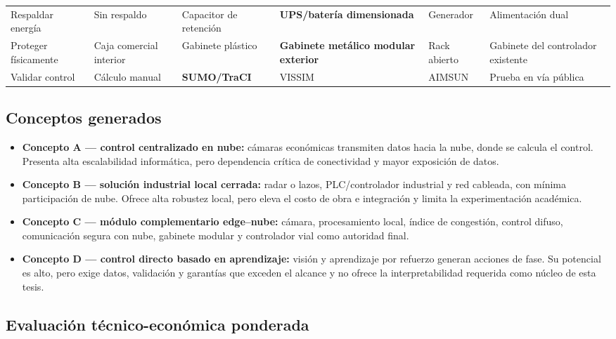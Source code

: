 \begin{landscape}
\begin{longtable}{@{}p{3.8cm}p{3.8cm}p{3.8cm}p{3.8cm}p{3.8cm}p{3.8cm}@{}}
Respaldar energía & Sin respaldo & Capacitor de retención & \textbf{UPS/batería dimensionada} & Generador & Alimentación dual\\
Proteger físicamente & Caja comercial interior & Gabinete plástico & \textbf{Gabinete metálico modular exterior} & Rack abierto & Gabinete del controlador existente\\
Validar control & Cálculo manual & \textbf{SUMO/TraCI} & VISSIM & AIMSUN & Prueba en vía pública\\
\bottomrule
\end{longtable}
\end{landscape}

\subsection{Conceptos generados}\label{sec:conceptos-generados}

\begin{itemize}
  \item \textbf{Concepto A --- control centralizado en nube:} cámaras económicas transmiten datos hacia la
  nube, donde se calcula el control. Presenta alta escalabilidad informática, pero dependencia crítica de
  conectividad y mayor exposición de datos.
  \item \textbf{Concepto B --- solución industrial local cerrada:} radar o lazos, PLC/controlador industrial y
  red cableada, con mínima participación de nube. Ofrece alta robustez local, pero eleva el costo de obra e
  integración y limita la experimentación académica.
  \item \textbf{Concepto C --- módulo complementario edge--nube:} cámara, procesamiento local, índice de
  congestión, control difuso, comunicación segura con nube, gabinete modular y controlador vial como autoridad
  final.
  \item \textbf{Concepto D --- control directo basado en aprendizaje:} visión y aprendizaje por refuerzo
  generan acciones de fase. Su potencial es alto, pero exige datos, validación y garantías que exceden el
  alcance y no ofrece la interpretabilidad requerida como núcleo de esta tesis.
\end{itemize}

\subsection{Evaluación técnico-económica ponderada}\label{sec:evaluacion-ponderada}

